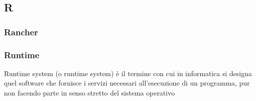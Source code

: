 \subsection*{\textbf{\hfill \Huge{R} \hfill}} 
\subsubsection*{Rancher}

\subsubsection*{Runtime}
Runtime system (o runtime system) è il termine con cui in informatica si designa quel software che fornisce i servizi necessari all'esecuzione di un programma, pur non facendo parte in senso stretto del sistema operativo
